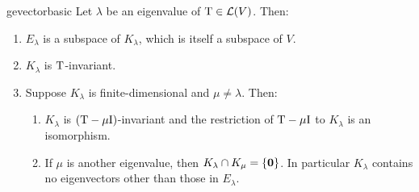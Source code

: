 \begin{lemm}{}{gevectorbasic}
	Let $\lambda$ be an eigenvalue of $\mathrm{T}\in\mathcal{L}(V)$. Then:
	\begin{enumerate}
	  \item $E_\lambda$ is a subspace of $K_\lambda$, which is itself a subspace of $V$.
	  \item $K_\lambda$ is $\mathrm{T}$-invariant.
	  \item Suppose $K_\lambda$ is finite-dimensional and $\mu\neq \lambda$. Then:
	  \begin{enumerate}
	    \item $K_\lambda$ is $(\mathrm{T}-\mu \mathrm{I})$-invariant and the restriction of $\mathrm{T}-\mu\mathrm{I}$ to $K_\lambda$ is an isomorphism.
	    \item If $\mu$ is another eigenvalue, then $K_\lambda\cap K_\mu=\{\mathbf{0}\}$. In particular $K_\lambda$ contains no eigenvectors other than those in $E_\lambda$. 
		\end{enumerate}
	\end{enumerate}
\end{lemm}

